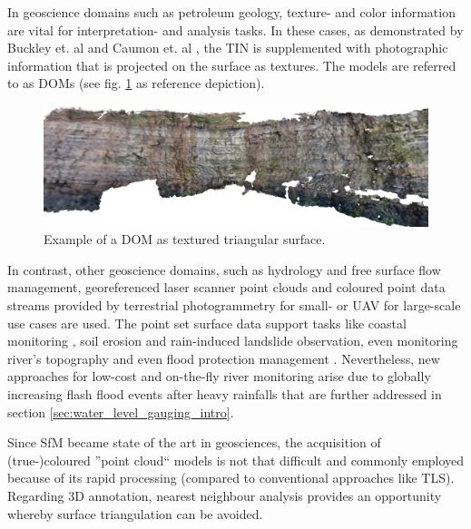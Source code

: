 \documentclass[review]{elsarticle}
\begin{document}
In geoscience domains such as petroleum geology, texture- and color information are vital for interpretation- and analysis tasks. In these cases, as demonstrated by Buckley et. al \cite{Buckley2008a} and Caumon et. al \cite{Caumon2013}, the \gls{TIN} is supplemented with photographic information that is projected on the surface as textures. The models are referred to as \glspl{DOM} (see fig. \ref{fig:representations:DOM} as reference depiction).%


\begin{figure}[htbp]
\begin{center}
	\includegraphics[width=0.95\linewidth]{graphics/DOM00}
	\caption{Example of a \gls{DOM} as textured triangular surface.}
	\label{fig:representations:DOM}
\end{center}
\end{figure}

In contrast, other geoscience domains, such as hydrology and free surface flow management, georeferenced laser scanner point clouds and coloured point data streams provided by terrestrial photogrammetry for small- or \gls{UAV} for large-scale use cases%
 are used. The point set surface data support tasks like coastal monitoring \cite{Letortu2017, Medjkane2018}, soil erosion and rain-induced landslide observation, even monitoring river's topography \cite{Watanabe2016} and even flood protection management \cite{Leskens2015}. Nevertheless, new approaches for low-cost and on-the-fly river monitoring \cite{Kroehnert2017a} arise due to globally increasing flash flood events after heavy rainfalls \cite{Mueller2011} that are further addressed in section \ref{sec:water_level_gauging_intro}.
 
Since \gls{SfM} became state of the art in geosciences, the acquisition of (true-)coloured ''point cloud`` models is not that difficult and commonly employed because of its rapid processing (compared to conventional approaches like \gls{TLS}). Regarding 3D annotation, nearest neighbour analysis provides an opportunity whereby surface triangulation can be avoided.
\end{document}
